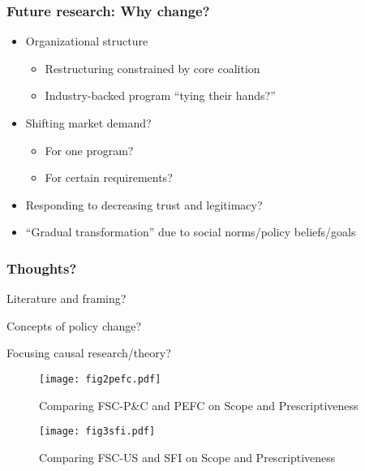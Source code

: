 \begin{frame}
\frametitle{Future research: Why change?}
\begin{itemize}
	\item Organizational structure \begin{itemize}
      \item Restructuring constrained by core coalition
      \item Industry-backed program ``tying their hands?''
      \end{itemize} \pause
     \item Shifting market demand? \begin{itemize}
     	\item For one program?
        \item For certain requirements?
     \end{itemize} \pause
     \item Responding to decreasing trust and legitimacy? \pause
     \item ``Gradual transformation'' due to social norms/policy beliefs/goals 
\end{itemize}
\end{frame}

\begin{frame}
\frametitle{Thoughts?}
Literature and framing? 

\bigskip

Concepts of policy change?

\bigskip

Focusing causal research/theory?
\end{frame}












\begin{frame}
\begin{figure}[h!]
\centering
\label{pefc}
\caption{Comparing FSC-P\&C and PEFC on Scope and Prescriptiveness}
\texttt{[image: fig2pefc.pdf]}
\end{figure}
\end{frame}

\begin{frame}
\begin{figure}[h!]
\centering
\label{sfi}
\caption{Comparing FSC-US and SFI on Scope and Prescriptiveness}
\texttt{[image: fig3sfi.pdf]}
\end{figure}
\end{frame}
